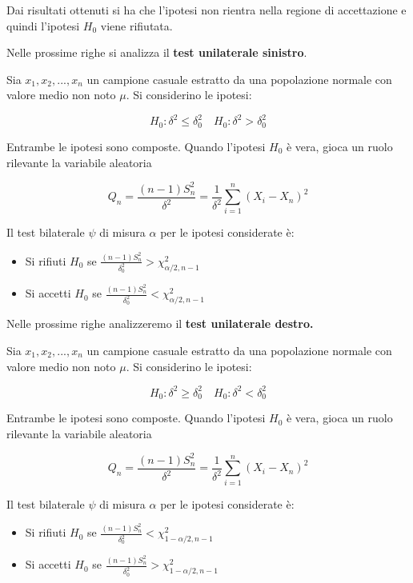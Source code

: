 Dai risultati ottenuti si ha che l'ipotesi non rientra nella regione di accettazione e quindi l'ipotesi $H_0$ viene rifiutata.

Nelle prossime righe si analizza il \textbf{test unilaterale sinistro}.

Sia $x_1, x_2, ..., x_n$ un campione casuale estratto da una popolazione normale con valore medio non noto $\mu$. Si considerino le ipotesi:

\[H_0:\delta^2 \leq \delta^2_0 \quad H_0:\delta^2 > \delta^2_0\]

Entrambe le ipotesi sono composte. Quando l'ipotesi $H_0$ è vera, gioca un ruolo rilevante la variabile aleatoria

\[Q_n = \frac{(n-1)S_n^2}{\delta^2} = \frac{1}{\delta^2} \sum_{i=1}^n(X_i - X_n)^2\]

Il test bilaterale $\psi$ di misura $\alpha$ per le ipotesi considerate è: 

\begin{itemize}
    \item Si rifiuti $H_0$ se $\frac{(n-1)S_n^2}{\delta_0^2} > \chi_{\alpha/2,n-1}^2$
    \item Si accetti $H_0$ se $\frac{(n-1)S_n^2}{\delta_0^2} < \chi_{\alpha/2,n-1}^2$
\end{itemize}

Nelle prossime righe analizzeremo il \textbf{test unilaterale destro.}

Sia $x_1, x_2, ..., x_n$ un campione casuale estratto da una popolazione normale con valore medio non noto $\mu$. Si considerino le ipotesi:

\[H_0:\delta^2 \geq \delta^2_0 \quad H_0:\delta^2 < \delta^2_0\]

Entrambe le ipotesi sono composte. Quando l'ipotesi $H_0$ è vera, gioca un ruolo rilevante la variabile aleatoria

\[Q_n = \frac{(n-1)S_n^2}{\delta^2} = \frac{1}{\delta^2} \sum_{i=1}^n(X_i - X_n)^2\]

Il test bilaterale $\psi$ di misura $\alpha$ per le ipotesi considerate è: 

\begin{itemize}
    \item Si rifiuti $H_0$ se $\frac{(n-1)S_n^2}{\delta_0^2} < \chi_{1- \alpha/2,n-1}^2$
    \item Si accetti $H_0$ se $\frac{(n-1)S_n^2}{\delta_0^2} > \chi_{1- \alpha/2,n-1}^2$
\end{itemize}

\newpage